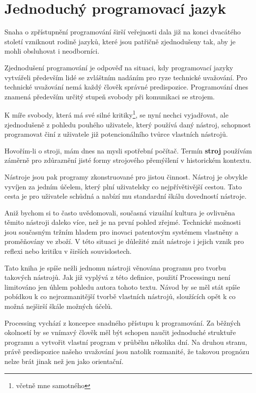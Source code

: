 \documentclass[10pt]{book}
\newcommand{\oddil}[1]{\section{#1}\index{#1}\label{#1}}
\newcommand{\slovnik}[1]{\textbf{\gls{#1}}\index{#1}\label{#1}}
\begin{document}
\oddil{Jednoduchý programovací jazyk}

Snaha o zpřístupnění programování širší veřejnosti dala již na konci dvacátého století vzniknout rodině jazyků, které jsou patřičně zjednodušeny tak, aby je mohli obsluhovat i neodborníci.

Zjednodušení programování je odpověď na situaci, kdy programovací jazyky vytvářeli především lidé se zvláštním nadáním pro ryze technické uvažování. Pro technické uvažování nemá každý člověk správné predispozice. Programování dnes znamená především určitý stupeň svobody při komunikaci se strojem.

K míře svobody, která má své silné kritiky\footnote{včetně mne samotného}, se nyní nechci vyjadřovat, ale zjednodušeně z pohledu pouhého uživatele, který používá daný nástroj, schopnost programovat činí z uživatele již potencionálního tvůrce vlastních nástrojů.

Hovořím-li o stroji, mám dnes na mysli spotřební počítač. Termín \slovnik{stroj} používám záměrně pro zdůraznění jisté formy strojového přemýšlení v historickém kontextu.

Nástroje jsou pak programy zkonstruované pro jistou činnost. Nástroj je obvykle vyvíjen za jedním účelem, který plní uživatelsky co nejpřívětivější cestou. Tato cesta je pro uživatele schůdná a nabízí mu standardní škálu dovedností nástroje.

Aniž bychom si to často uvědomovali, současná vizuální kultura je ovlivněna těmito nástroji daleko více, než je na první pohled zřejmé. Technické možnosti jsou současným tržním hladem pro inovaci patentovým systémem vlastněny a proměňovány ve zboží. V této situaci je důležité znát nástroje i jejich vznik pro reflexi nebo kritiku v širších souvislostech.

Tato kniha je spíše nežli jednomu nástroji věnována programu pro tvorbu takových nástrojů. Jak již vyplývá z této definice, použití Processingu není limitováno jen úhlem pohledu autora tohoto textu. Návod by se měl stát spíše pobídkou k co nejrozmanitější tvorbě vlastních nástrojů, sloužících opět k co možná nejširší škále možných účelů.

Processing vychází z koncepce snadného přístupu k programování. Za běžných okolností by se vnímavý člověk měl být schopen naučit jednoduché struktuře programu a vytvořit vlastní program v průběhu několika dní. Na druhou stranu, právě predispozice našeho uvažování jsou natolik rozmanité, že takovou prognózu nelze brát jinak než jen jako orientační.
\end{document}

